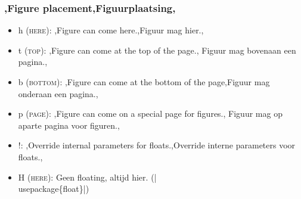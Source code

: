 
\begin{frame}
	\frametitle{\lang,Figure placement,Figuurplaatsing,}

	
	\begin{itemize}
		\item h \textsc{(here)}: \lang,Figure can come here.,Figuur mag hier.,
		\item t \textsc{(top)}: \lang,Figure can come at the top of the page.,%
			Figuur mag bovenaan een pagina.,
		\item b \textsc{(bottom)}: \lang,Figure can come at the bottom of the
			page,Figuur mag onderaan een pagina.,
		\item p \textsc{(page)}: \lang,Figure can come on a special page for figures.,%
			Figuur mag op aparte pagina voor figuren.,
		\item !: \lang,Override internal parameters for floats.,Override interne parameters voor floats.,
		\item H \textsc{(here)}: 
		{Geen floating, altijd hier.} (\hll|\\usepackage\{float\}|)
	\end{itemize}

	\medskip

\end{frame}
